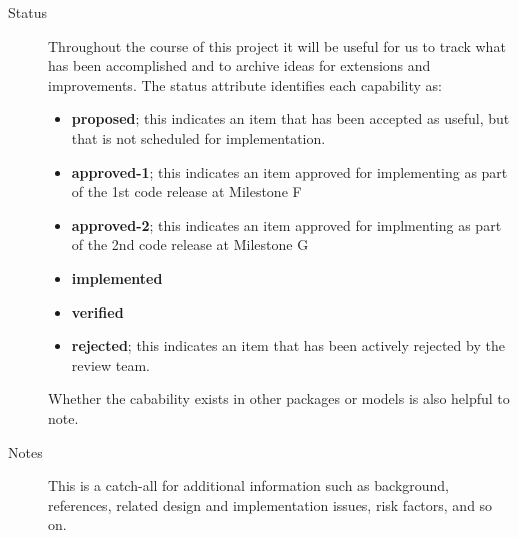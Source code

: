 \begin{description}
\item [Status] Throughout the course of this project it will be 
useful for us to track what has been accomplished and to archive 
ideas for extensions and improvements.  The status attribute identifies
each capability as:
\begin{itemize}
\item {\bf proposed}; this indicates an item that has been accepted as useful, but
that is not scheduled for implementation.
\item {\bf approved-1}; this indicates an item approved for implementing as part
of the 1st code release at Milestone F
\item {\bf approved-2}; this indicates an item approved for implmenting as part 
of the 2nd code release at Milestone G
\item {\bf implemented}
\item {\bf verified}
\item {\bf rejected}; this indicates an item that has been actively rejected by
the review team.
\end{itemize}
Whether the cabability exists in other packages or models
is also helpful to note.

\item [Notes] This is a catch-all for additional information such
as background, references, related design and implementation issues, 
risk factors, and so on.

\end{description}


